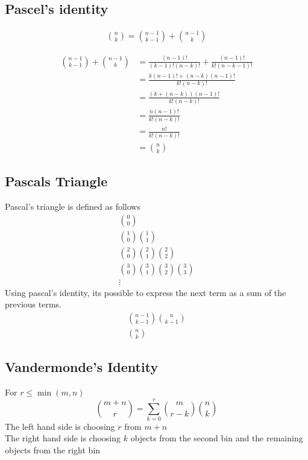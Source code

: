 \documentclass{article}
\theoremstyle{mytheoremstyle}
\theoremstyle{mytheoremstyle}
\theoremstyle{myproblemstyle}
\begin{document}
    \subsection*{Pascel's identity}
    \begin{align*}
        \binom{n}{k} = \binom{n-1}{k-1} + \binom{n-1}{k}
    \end{align*}

    \begin{align*}
        \binom{n-1}{k-1} + \binom{n-1}{k}
        &= \frac{(n-1)!}{(k-1)!(n-k)!} + \frac{(n-1)!}{k!(n-k-1)!} \\
        &= \frac{k(n-1)! + (n-k)(n-1)!}{k!(n-k)!} \\
        &= \frac{(k + (n-k))(n-1)!}{k!(n-k)!} \\
        &= \frac{n(n-1)!}{k!(n-k)!} \\
        &= \frac{n!}{k!(n-k)!} \\
        &= \binom{n}{k}
    \end{align*}

    \subsection*{Pascals Triangle}
    Pascal's triangle is defined as follows
    \begin{gather*}
        \binom{0}{0} \\
        \binom{1}{0}
        \binom{1}{1} \\
        \binom{2}{0}
        \binom{2}{1}
        \binom{2}{2} \\
        \binom{3}{0}
        \binom{3}{1}
        \binom{3}{2}
        \binom{3}{3} \\
        \vdots
    \end{gather*}
    Using pascal's identity, its possible to express the next term as a sum of
    the previous terms.
    \begin{gather*}
        \binom{n-1}{k-1} \binom{n}{k-1} \\
        \binom{n}{k}
    \end{gather*}

    \subsection*{Vandermonde's Identity}
    For $r\le \min(m,n)$
    \[
        \binom{m+n}{r} = \sum_{k=0}^{r} \binom{m}{r-k}\binom{n}{k}
    \]
    The left hand side is choosing $r$ from $m+n$ \\
    The right hand side is choosing $k$ objects from the second bin and the
    remaining objects from the right bin
\end{document}
